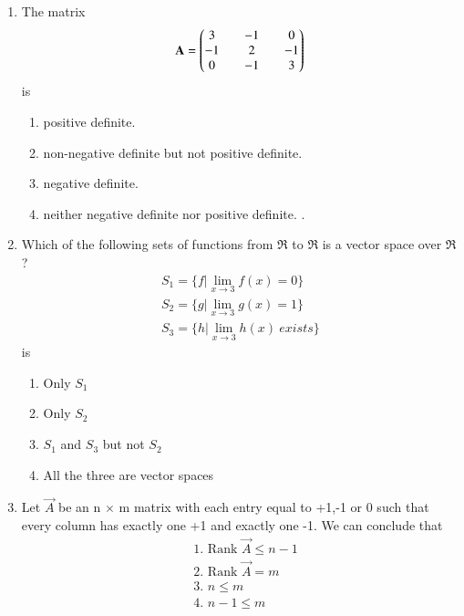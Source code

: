 \renewcommand{\theequation}{\theenumi}
\renewcommand{\thefigure}{\theenumi}
\renewcommand{\thetable}{\theenumi}
\begin{enumerate}[label=\thesection.\arabic*.,ref=\thesection.\theenumi]

\item The matrix
\begin{align}
\mathbf{A} = \begin{pmatrix}3 && -1 && 0 \\ -1 && 2 && -1\\ 0 && -1 && 3\end{pmatrix}
\end{align}
is
\begin{enumerate}
\item positive definite.
\item non-negative definite but not positive definite.
\item negative definite. 
\item neither negative definite nor positive definite. .
\end{enumerate}
%
\solution

\item Which of the following sets of functions from $\Re$ to $\Re$ is a vector space over $\Re$?
\begin{align}
S_1 = \{f|\lim_{x\to3} f(x) = 0\}\\
S_2 = \{g|\lim_{x\to3} g(x) = 1\}\\
S_3 = \{h|\lim_{x\to3} h(x)~exists\}
\end{align}
is
\begin{enumerate}
\item Only $S_1$ 
\item Only $S_2$
\item $S_1$ and $S_3$ but not $S_2$ 
\item All the three are vector spaces
\end{enumerate}
%
\solution

\item Let $\vec{A}$ be an n $\times$ m matrix with each entry equal to +1,-1 or 0 such that every column has exactly one +1 and exactly one -1. We can conclude that\\
\begin{align}
    &\mbox{1. Rank } \vec{A}\leq n-1\\
    &\mbox{2. Rank } \vec{A}=m\\    
    &\mbox{3. }n\leq m\\
    &\mbox{4. }n-1\leq m
\end{align}
%
%
\solution



\end{enumerate}
